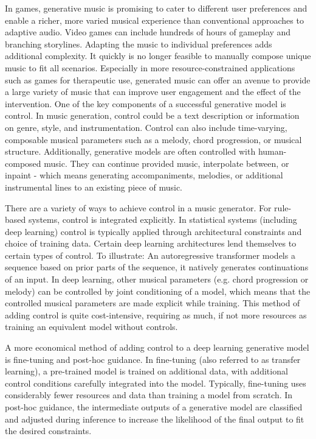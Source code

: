In games, generative music is promising to cater to different user preferences and enable a richer, more varied musical experience than conventional approaches to adaptive audio. Video games can include hundreds of hours of gameplay and branching storylines. Adapting the music to individual preferences adds additional complexity. It quickly is no longer feasible to manually compose unique music to fit all scenarios. Especially in more resource-constrained applications such as games for therapeutic use, generated music can offer an avenue to provide a large variety of music that can improve user engagement and the effect of the intervention.
One of the key components of a successful generative model is control. In music generation, control could be a text description or information on genre, style, and instrumentation. Control can also include time-varying, composable musical parameters such as a melody, chord progression, or musical structure. Additionally, generative models are often controlled with human-composed music. They can continue provided music, interpolate between, or inpaint - which means generating accompaniments, melodies, or additional instrumental lines to an existing piece of music. 

There are a variety of ways to achieve control in a music generator. For rule-based systems, control is integrated explicitly. In statistical systems (including deep learning) control is typically applied through architectural constraints and choice of training data. Certain deep learning architectures lend themselves to certain types of control. To illustrate: An autoregressive transformer models a sequence based on prior parts of the sequence, it natively generates continuations of an input. In deep learning, other musical parameters (e.g. chord progression or melody) can be controlled by joint conditioning of a model, which means that the controlled musical parameters are made explicit while training. This method of adding control is quite cost-intensive, requiring as much, if not more resources as training an equivalent model without controls. 

A more economical method of adding control to a deep learning generative model is fine-tuning and post-hoc guidance. In fine-tuning (also referred to as transfer learning), a pre-trained model is trained on additional data, with additional control conditions carefully integrated into the model. Typically, fine-tuning uses considerably fewer resources and data than training a model from scratch. In post-hoc guidance, the intermediate outputs of a generative model are classified and adjusted during inference to increase the likelihood of the final output to fit the desired constraints. 
 
